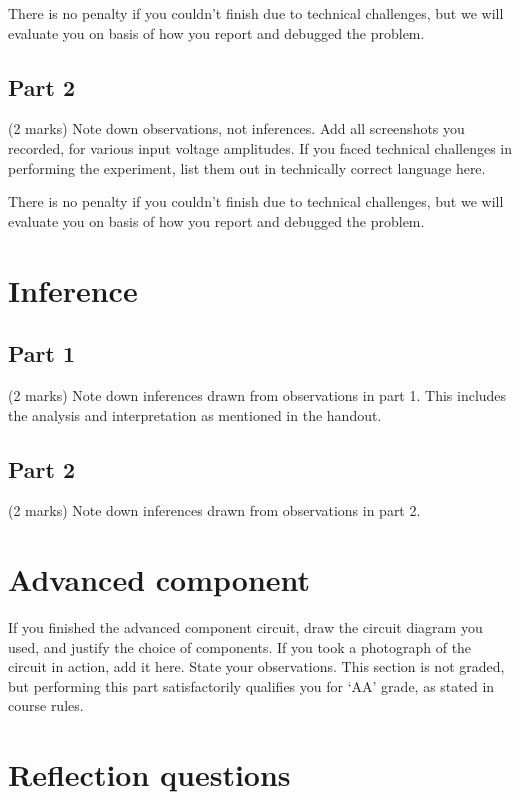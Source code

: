 \documentclass[12pt]{article}
\begin{document}
There is no penalty if you couldn't finish due to technical challenges, but we will evaluate you on basis of how you report and debugged the problem.

\subsection{Part 2}

(2 marks) Note down observations, not inferences. Add all screenshots you recorded, for various input voltage amplitudes. If you faced technical challenges in performing the experiment, list them out in technically correct language here.

There is no penalty if you couldn't finish due to technical challenges, but we will evaluate you on basis of how you report and debugged the problem.

\section{Inference}

\subsection{Part 1}

(2 marks) Note down inferences drawn from observations in part 1. This includes the analysis and interpretation as mentioned in the handout.

\subsection{Part 2}

(2 marks) Note down inferences drawn from observations in part 2.

\section{Advanced component}

If you finished the advanced component circuit, draw the circuit diagram you used, and justify the choice of components. If you took a photograph of the circuit in action, add it here. State your observations. This section is not graded, but performing this part satisfactorily qualifies you for `AA' grade, as stated in course rules.

\section{Reflection questions}
\end{document}
